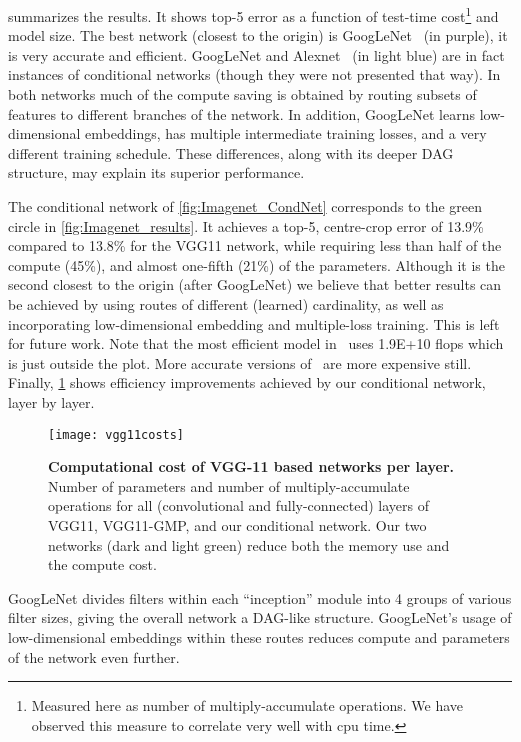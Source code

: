 \documentclass[thesis]{subfiles}
\begin{document}
	
	 summarizes the results.
	It shows top-5 error as a function of test-time 
	cost\footnote{Measured here as number of multiply-accumulate operations. We have observed this measure 
		to correlate very well with \gls{cpu} time.} and model size. 
	The best network (closest to the origin) is GoogLeNet~\citep{Szegedy2014going} (in purple), it is very accurate and efficient. 
	GoogLeNet and Alexnet~\citep{Krizhevsky2012} (in light blue) are in fact instances of conditional networks 
	(though they were not presented that way). In both networks much of the compute saving is obtained by routing
	subsets of features to different branches of the network.
	In addition, GoogLeNet learns low-dimensional embeddings, has multiple intermediate training losses, and a very 
	different training schedule. These differences, along with its deeper DAG structure, may explain its superior performance.
	
	The conditional network of \cref{fig:Imagenet_CondNet} 
	corresponds to the green circle in \cref{fig:Imagenet_results}.
	It achieves a top-5, centre-crop error of
	13.9\% compared to 13.8\% for the VGG11 network, while requiring less than half of the compute (45\%),
	and almost one-fifth (21\%) of the parameters.
	Although it is the second closest to the origin (after GoogLeNet) we believe that better results can be achieved 
	by using routes of different (learned) cardinality, as well as incorporating low-dimensional embedding and multiple-loss training. This is left for future work. 
	Note that the most efficient model in~\citep{He2015b} uses 1.9E+10 flops which is just outside the plot. 
	More accurate versions of~\citep{He2015b} are more expensive still.
	Finally, \cref{fig:VggPerLayerCost} shows efficiency improvements achieved by our conditional network, layer by layer.
	
	\begin{figure}[tbp]
		\centering
		\texttt{[image: vgg11costs]}
		\caption[Computational cost of VGG-11 based networks per layer]{\textbf{Computational cost of VGG-11 based networks per layer.} Number of parameters and number of multiply-accumulate operations for all (convolutional and fully-connected) layers of VGG11, VGG11-GMP, and our conditional network. Our two networks (dark and light green) reduce both the memory use and the compute cost.}\label{fig:VggPerLayerCost}
	\end{figure}
	GoogLeNet divides filters within each ``inception'' module into 4 groups of various filter sizes, giving the overall network a DAG-like structure. GoogLeNet's usage of low-dimensional embeddings within these routes reduces compute and parameters of the network even further.
	
\end{document}
